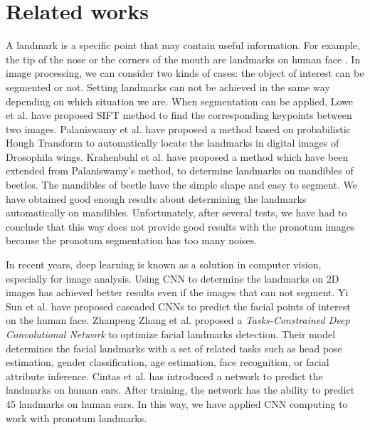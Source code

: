 \documentclass[conference]{IEEEtran}
\begin{document}
\section{Related works}
A landmark is a specific point that may contain useful information. For example, the tip of the nose or the corners of the mouth are landmarks on human face \cite{sun2013deep}. In image processing, we can consider two kinds of cases: the object of interest can be segmented or not. Setting landmarks can not be achieved in the same way depending on which situation we are. When segmentation can be applied, Lowe et al. \cite{lowe2004distinctive} have proposed SIFT method to find the corresponding keypoints between two images. Palaniswamy et al. \cite{palaniswamy2010automatic} have proposed a method based on probabilistic Hough Transform to automatically locate the landmarks in digital images of Drosophila wings. Krahenbuhl et al. \cite{le2017maelab} have proposed a method which have been extended from Palaniswamy's method, to determine landmarks on mandibles of beetles. The mandibles of beetle have the simple shape and easy to segment. We have obtained good enough results about determining the landmarks automatically on mandibles. Unfortunately, after several tests, we have had to conclude that this way does not provide good results with the pronotum images because the pronotum segmentation has too many noises.

In recent years, deep learning is known as a solution in computer vision, especially for image analysis. Using CNN to determine the landmarks on 2D images has achieved better results even if the images that can not segment. Yi Sun et al. \cite{sun2013deep} have proposed cascaded CNNs to predict the facial points of interest on the human face.
Zhanpeng Zhang et al. \cite{zhang2014facial} proposed a \textit{Tasks-Constrained Deep Convolutional Network} to optimize facial landmarks detection. Their model determines the facial landmarks with a set of related tasks such as head pose estimation, gender classification, age estimation, face recognition, or facial attribute inference. Cintas et al. \cite{cintas2016automatic} has introduced a network to predict the landmarks on human ears. After training, the network has the ability to predict 45 landmarks on human ears. In this way, we have applied CNN computing to work with pronotum landmarks.
\end{document}
